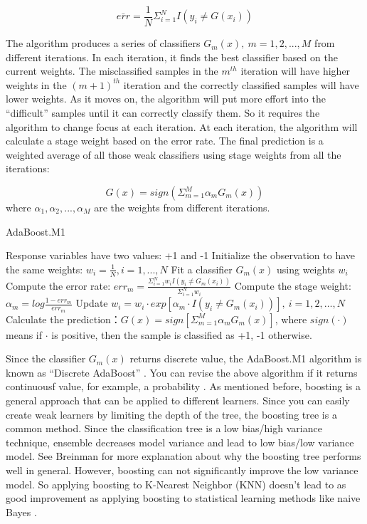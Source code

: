 \documentclass[
  12pt,
]{krantz}
\begin{document}
\[\bar{err}=\frac{1}{N}\Sigma_{i=1}^NI(y_i\neq G(x_i))\]

The algorithm produces a series of classifiers \(G_m(x),\ m=1,2,...,M\) from different iterations. In each iteration, it finds the best classifier based on the current weights. The misclassified samples in the \(m^{th}\) iteration will have higher weights in the \((m+1)^{th}\) iteration and the correctly classified samples will have lower weights. As it moves on, the algorithm will put more effort into the ``difficult'' samples until it can correctly classify them. So it requires the algorithm to change focus at each iteration. At each iteration, the algorithm will calculate a stage weight based on the error rate. The final prediction is a weighted average of all those weak classifiers using stage weights from all the iterations:

\[G(x)=sign ( \Sigma_{m=1}^M \alpha_{m}G_m(x))\]
where \(\alpha_1,\alpha_2,...,\alpha_M\) are the weights from different iterations.

\begin{algorithm}
\caption{AdaBoost.M1}\label{AdaBoostM1algorithm} 
\begin{algorithmic}[1] 
\State Response variables have two values: +1 and -1
\State Initialize the observation to have the same weights:  $w_i=\frac{1}{N},i=1,...,N$
    \State Fit a classifier $G_m(x)$ using weights $w_i$
    \State Compute the error rate: $err_m=\frac{\Sigma_{i=1}^Nw_i I(y_i\neq G_m(x_i))}{\Sigma_{i=1}^Nw_i}$
    \State Compute the stage weight: $\alpha_m=log\frac{1-err_m}{err_m}$
    \State Update $w_i = w_i\cdot exp[\alpha_m\cdot I(y_i \neq G_m(x_i))],\ i=1,2,\dots,N$
\EndFor
\State Calculate the prediction：$G(x)=sign[\Sigma_{m=1}^M\alpha_mG_m(x)]$, where $sign(\cdot)$ means if $\cdot$ is positive, then the sample is classified as +1, -1 otherwise.
\end{algorithmic}
\end{algorithm}

Since the classifier \(G_m(x)\) returns discrete value, the AdaBoost.M1 algorithm is known as ``Discrete AdaBoost'' \citep{Friedman2000}. You can revise the above algorithm if it returns continuousf value, for example, a probability \citep{Friedman2000}. As mentioned before, boosting is a general approach that can be applied to different learners. Since you can easily create weak learners by limiting the depth of the tree, the boosting tree is a common method. Since the classification tree is a low bias/high variance technique, ensemble decreases model variance and lead to low bias/low variance model. See Breinman \citep{Breiman1998} for more explanation about why the boosting tree performs well in general. However, boosting can not significantly improve the low variance model. So applying boosting to K-Nearest Neighbor (KNN) doesn't lead to as good improvement as applying boosting to statistical learning methods like naive Bayes \citep{Bauer1999}.
\end{document}
